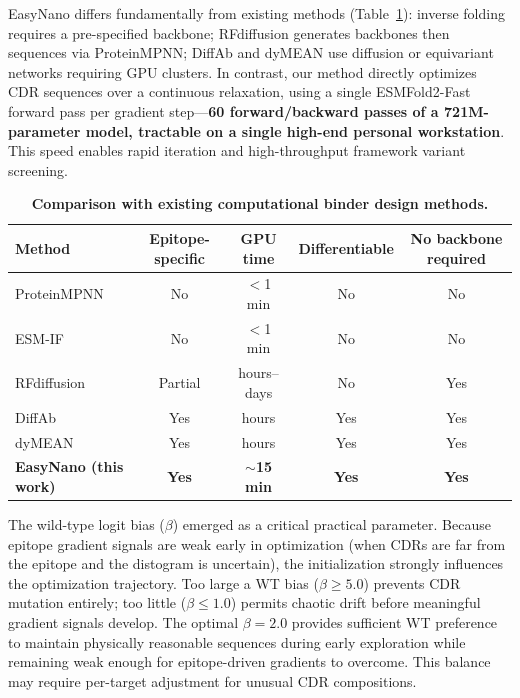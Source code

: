 \documentclass[11pt,a4paper]{article}
\begin{document}
EasyNano differs fundamentally from existing methods (Table~\ref{tab:comparison}): inverse folding\cite{dauparas2022,hsu2022} requires a pre-specified backbone; RFdiffusion\cite{watson2023} generates backbones then sequences via ProteinMPNN; DiffAb\cite{luo2022} and dyMEAN\cite{kong2023} use diffusion or equivariant networks requiring GPU clusters. In contrast, our method directly optimizes CDR sequences over a continuous relaxation, using a single ESMFold2-Fast forward pass per gradient step---\textbf{60 forward/backward passes of a 721M-parameter model, tractable on a single high-end personal workstation}. This speed enables rapid iteration and high-throughput framework variant screening.

\begin{table}[H]
\centering
\caption{\textbf{Comparison with existing computational binder design methods.}}
\label{tab:comparison}
\begin{tabular}{@{}lcccc@{}}
\toprule
Method & Epitope-specific & GPU time & Differentiable & No backbone required \\
\midrule
ProteinMPNN\cite{dauparas2022} & No & $<$1 min & No & No \\
ESM-IF\cite{hsu2022} & No & $<$1 min & No & No \\
RFdiffusion\cite{watson2023} & Partial & hours--days & No & Yes \\
DiffAb\cite{luo2022} & Yes & hours & Yes & Yes \\
dyMEAN\cite{kong2023} & Yes & hours & Yes & Yes \\
\textbf{EasyNano (this work)} & \textbf{Yes} & \textbf{$\sim$15 min} & \textbf{Yes} & \textbf{Yes} \\
\bottomrule
\end{tabular}
\end{table}

The wild-type logit bias ($\beta$) emerged as a critical practical parameter. Because epitope gradient signals are weak early in optimization (when CDRs are far from the epitope and the distogram is uncertain), the initialization strongly influences the optimization trajectory. Too large a WT bias ($\beta \ge 5.0$) prevents CDR mutation entirely; too little ($\beta \le 1.0$) permits chaotic drift before meaningful gradient signals develop. The optimal $\beta = 2.0$ provides sufficient WT preference to maintain physically reasonable sequences during early exploration while remaining weak enough for epitope-driven gradients to overcome. This balance may require per-target adjustment for unusual CDR compositions.
\end{document}
